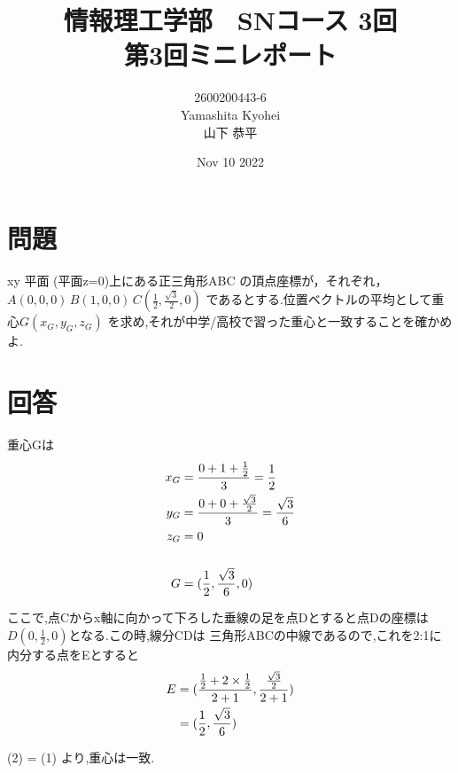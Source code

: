 \documentclass[dvipdfmx,autodetect-engine,titlepage]{jsarticle}
\title{情報理工学部　SNコース 3回\\
第3回ミニレポート\\}
\author{2600200443-6\\Yamashita Kyohei\\山下 恭平}
\date{Nov 10 2022}
\begin{document}
\maketitle

\section*{問題}
xy 平面 (平面z=0)上にある正三角形ABC の頂点座標が，それぞれ，\begin{math}
A(0,0,0)\,B(1,0,0)\,C(\frac{1}{2},\frac{\sqrt{3}}{2},0)\end{math}
であるとする.位置ベクトルの平均として重心\begin{math}G(x_{G},y_{G},z_{G})\end{math}
を求め,それが中学/高校で習った重心と一致することを確かめよ.

\section*{回答}
重心Gは
\begin{align}
  x_{G} &= \frac{0 + 1 + \frac{1}{2}}{3} = \frac{1}{2}\notag\\
  y_{G} &= \frac{0 + 0 + \frac{\sqrt{3}}{2}}{3} = \frac{\sqrt{3}}{6}\notag\\
  z_{G} &= 0\notag\\\notag\\
  G &= (\frac{1}{2},\frac{\sqrt{3}}{6},0)
\end{align}

ここで,点Cからx軸に向かって下ろした垂線の足を点Dとすると点Dの座標は
\begin{math}D(0,\frac{1}{2},0)\end{math}となる.この時,線分CDは
三角形ABCの中線であるので,これを2:1に内分する点をEとすると
\begin{align}
  E &= (\frac{\frac{1}{2} + 2\times\frac{1}{2}}{2+1} , \frac{\frac{\sqrt{3}}{2}}{2+1})\notag\\
    &= (\frac{1}{2} , \frac{\sqrt{3}}{6})
\end{align}

(2) = (1) より,重心は一致.
\end{document}
